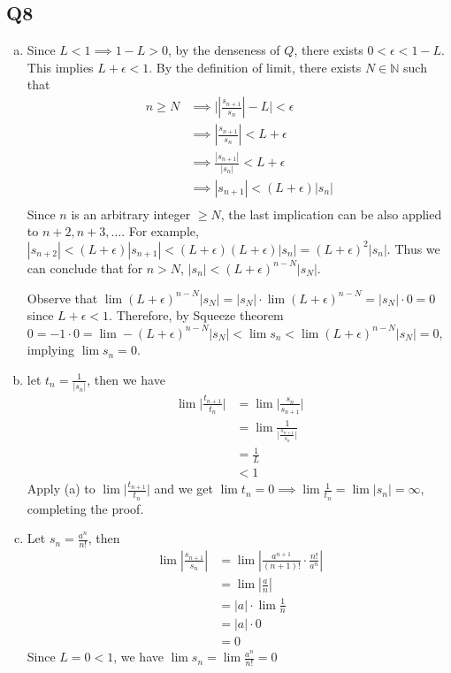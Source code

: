 \documentclass[12pt,lettersize]{article}
\theoremstyle{remark}
\newcommand{\N}{\mathbb{N}}
\begin{document}
\subsection*{Q8}
\begin{enumerate}[(a)]
	\item Since $L<1\implies1-L>0$, by the denseness of $Q$, there exists $0<\epsilon<1-L$. This implies $L+\epsilon<1$. By the definition of limit, there exists $N\in\N$ such that
	\begin{align*}
		n\geq N &\implies \Bigg|\left|\frac{s_{n+1}}{s_n}\right|-L\Bigg|<\epsilon\\
				&\implies \left|\frac{s_{n+1}}{s_n}\right|<L+\epsilon\\
				&\implies \frac{|s_{n+1}|}{|s_n|}<L+\epsilon\\
				&\implies |s_{n+1}|<(L+\epsilon)|s_n|\\
	\end{align*}
	Since $n$ is an arbitrary integer $\geq N$, the last implication can be also applied to $n+2, n+3,\dots$. For example, $|s_{n+2}|<(L+\epsilon)|s_{n+1}|<(L+\epsilon)(L+\epsilon)|s_n|=(L+\epsilon)^2|s_n|$. Thus we can conclude that for $n>N$, $|s_n|<(L+\epsilon)^{n-N}|s_N|$.
	
	Observe that $\lim(L+\epsilon)^{n-N}|s_N|=|s_N|\cdot\lim(L+\epsilon)^{n-N}=|s_N|\cdot0=0$ since $L+\epsilon<1$. Therefore, by Squeeze theorem $0=-1\cdot0=\lim-(L+\epsilon)^{n-N}|s_N|<\lim s_n<\lim(L+\epsilon)^{n-N}|s_N|=0$, implying $\lim s_n=0$.
	\item let $t_n=\frac{1}{|s_n|}$, then we have 
	\begin{align*}
		\lim\bigg|\frac{t_{n+1}}{t_n}\bigg| &= \lim\bigg|\frac{s_n}{s_{n+1}}\bigg|\\
										  &= \lim\frac{1}{\big|\frac{s_{n+1}}{s_n}\big|}\\
										  &= \frac{1}{L}\\
										  &< 1
	\end{align*}
	Apply (a) to $\lim\big|\frac{t_{n+1}}{t_n}\big|$ and we get $\lim t_n=0 \implies \lim \frac{1}{t_n}=\lim|s_n|=\infty$, completing the proof.
	\item Let $s_n=\frac{a^n}{n!}$, then 
	\begin{align*}
		\lim\left|\frac{s_{n+1}}{s_n}\right|&=\lim\left|\frac{a^{n+1}}{(n+1)!}\cdot\frac{n!}{a^n}\right|\\
											&=\lim\left|\frac{a}{n}\right|\\
											&=|a|\cdot\lim\frac{1}{n}\\
											&=|a|\cdot0\\
											&=0
	\end{align*}
	Since $L=0<1$, we have $\lim s_n=\lim \frac{a^n}{n!}=0$
\end{enumerate}
\newpage
\end{document}
